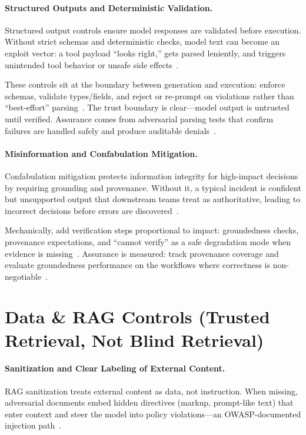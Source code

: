 \begin{TNtwocol}
  \paragraph{Structured Outputs and Deterministic Validation.}
  Structured output controls ensure model responses are validated before execution. Without strict schemas and deterministic checks, model text can become an exploit vector: a tool payload “looks right,” gets parsed leniently, and triggers unintended tool behavior or unsafe side effects~\cite{owasp-top10-llm-2025,nist-sp800-53b}.

  These controls sit at the boundary between generation and execution: enforce schemas, validate types/fields, and reject or re-prompt on violations rather than “best-effort” parsing~\cite{owasp-top10-llm-2025,nist-sp800-53b}. The trust boundary is clear—model output is untrusted until verified. Assurance comes from adversarial parsing tests that confirm failures are handled safely and produce auditable denials~\cite{owasp-top10-llm-2025,nist-sp800-53b}.

  \paragraph{Misinformation and Confabulation Mitigation.}
  Confabulation mitigation protects information integrity for high-impact decisions by requiring grounding and provenance. Without it, a typical incident is confident but unsupported output that downstream teams treat as authoritative, leading to incorrect decisions before errors are discovered~\cite{nist-genai-600-1,nist-airmf-100-1}.

  Mechanically, add verification steps proportional to impact: groundedness checks, provenance expectations, and “cannot verify” as a safe degradation mode when evidence is missing~\cite{nist-genai-600-1,nist-airmf-100-1}. Assurance is measured: track provenance coverage and evaluate groundedness performance on the workflows where correctness is non-negotiable~\cite{nist-genai-600-1,nist-airmf-100-1}.

  \section{Data \& RAG Controls (Trusted Retrieval, Not Blind Retrieval)}

  \paragraph{Sanitization and Clear Labeling of External Content.}
  RAG sanitization treats external content as data, not instruction. When missing, adversarial documents embed hidden directives (markup, prompt-like text) that enter context and steer the model into policy violations—an OWASP-documented injection path~\cite{owasp-prompt-injection-cheatsheet,owasp-top10-llm-2025}.


\end{TNtwocol}
